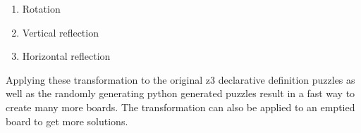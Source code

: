 \begin{enumerate}
\item Rotation
\item Vertical reflection
\item Horizontal reflection
\end{enumerate}

Applying these transformation to the original z3 declarative
definition puzzles as well as the randomly generating python generated
puzzles result in a fast way to create many more boards. The
transformation can also be applied to an emptied board to get more
solutions.

